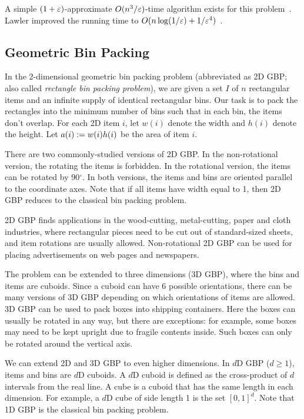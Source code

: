 A simple $(1+\varepsilon)$-approximate $O(n^3/\varepsilon)$-time algorithm
exists for this problem~\cite{daa:rounding-dp}.
Lawler improved the running time to $O(n\log(1/\varepsilon) + 1/\varepsilon^4)$~\cite{lawler1979fast}.

\subsection{Geometric Bin Packing}

In the 2-dimensional geometric bin packing problem
(abbreviated as 2D GBP; also called \emph{rectangle bin packing problem}),
we are given a set $I$ of $n$ rectangular items and an infinite supply
of identical rectangular bins.
Our task is to pack the rectangles into the minimum number of bins such that
in each bin, the items don't overlap.
For each 2D item $i$, let $w(i)$ denote the width and $h(i)$ denote the height.
Let $a(i) := w(i)h(i)$ be the area of item $i$.

There are two commonly-studied versions of 2D GBP.
In the non-rotational version, the rotating the items is forbidden.
In the rotational version, the items can be rotated by 90$^\circ$.
In both versions, the items and bins are oriented parallel to the coordinate axes.
Note that if all items have width equal to 1, then 2D GBP reduces to
the classical bin packing problem.

2D GBP finds applications in the wood-cutting, metal-cutting, paper and cloth industries,
where rectangular pieces need to be cut out of standard-sized sheets,
and item rotations are usually allowed.
Non-rotational 2D GBP can be used for placing advertisements on web pages and newspapers.

The problem can be extended to three dimensions (3D GBP),
where the bins and items are cuboids.
Since a cuboid can have 6 possible orientations, there can be
many versions of 3D GBP depending on which orientations of items are allowed.
3D GBP can be used to pack boxes into shipping containers.
Here the boxes can usually be rotated in any way, but there are exceptions:
for example, some boxes may need to be kept upright due to fragile contents inside.
Such boxes can only be rotated around the vertical axis.

We can extend 2D and 3D GBP to even higher dimensions.
In $d$D GBP ($d \ge 1$), items and bins are $d$D cuboids.
A $d$D cuboid is defined as the cross-product of $d$ intervals from the real line.
A cube is a cuboid that has the same length in each dimension.
For example, a $d$D cube of side length 1 is the set $[0, 1]^d$.
Note that 1D GBP is the classical bin packing problem.

